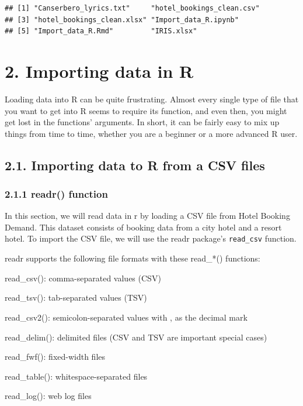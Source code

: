 \documentclass[
]{article}
\begin{document}
\begin{verbatim}
## [1] "Canserbero_lyrics.txt"     "hotel_bookings_clean.csv" 
## [3] "hotel_bookings_clean.xlsx" "Import_data_R.ipynb"      
## [5] "Import_data_R.Rmd"         "IRIS.xlsx"
\end{verbatim}

\hypertarget{importing-data-in-r}{%
\section{2. Importing data in R}\label{importing-data-in-r}}

Loading data into R can be quite frustrating. Almost every single type
of file that you want to get into R seems to require its function, and
even then, you might get lost in the functions' arguments. In short, it
can be fairly easy to mix up things from time to time, whether you are a
beginner or a more advanced R user.

\hypertarget{importing-data-to-r-from-a-csv-files}{%
\subsection{2.1. Importing data to R from a CSV
files}\label{importing-data-to-r-from-a-csv-files}}

\hypertarget{readr-function}{%
\subsubsection{2.1.1 readr() function}\label{readr-function}}

In this section, we will read data in r by loading a CSV file from Hotel
Booking Demand. This dataset consists of booking data from a city hotel
and a resort hotel. To import the CSV file, we will use the readr
package's \texttt{read\_csv} function.

readr supports the following file formats with these read\_*()
functions:

read\_csv(): comma-separated values (CSV)

read\_tsv(): tab-separated values (TSV)

read\_csv2(): semicolon-separated values with , as the decimal mark

read\_delim(): delimited files (CSV and TSV are important special cases)

read\_fwf(): fixed-width files

read\_table(): whitespace-separated files

read\_log(): web log files
\end{document}
